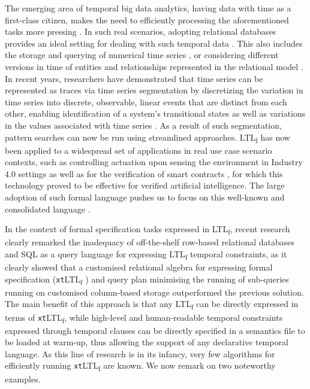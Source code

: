 \documentclass[sigconf]{acmart}
\begin{document}
The emerging area of temporal big data analytics, having data with time as a first-class citizen, makes the need to efficiently processing the aforementioned tasks more pressing \cite{cuzzocrea:LIPIcs.TIME.2021.4,DBLP:reference/db/Amer-YahiaPTKDC18}. In such real scenarios, adopting relational databases provides an ideal setting for dealing with such temporal data \cite{DBLP:conf/caise/SchonigRCJM16}. This also includes the storage and querying of numerical
time series \cite{DBLP:journals/pacmmod/HuangZCS23}, or considering different versions in time of entities and relationships represented in the relational
model \cite{5963680,DBLP:journals/pvldb/KaufmannVFKF13,DBLP:journals/isci/WangJS95,DBLP:conf/cikm/Wang95}. In recent years, researchers have demonstrated that time series can be represented as traces via time series segmentation by discretizing the variation in time series into discrete, observable, linear events that are distinct from each other, enabling identification of a system's transitional states \cite{DBLP:journals/pacmmod/00080ZC23} as well as variations in the values associated with time series \cite{HUO2022117176}. As a result of such segmentation, pattern searches can now be run using streamlined approaches. LTL\textsubscript{f} has now been applied to a widespread set of applications in real use case scenario contexts, such as controlling actuation upon sensing the environment in Industry 4.0 settings  \cite{9591387} as well as for the verification of smart contracts \cite{10.1007/978-3-031-08421-8_9}, for which this technology proved to be effective for verified artificial intelligence. The large adoption of such formal language  pushes us to focus on this well-known and consolidated language \cite{4567924,DBLP:conf/ijcai/GiacomoV13}.

In the context of formal specification tasks expressed in LTL\textsubscript{f}, recent research clearly remarked the inadequacy of off-the-shelf row-based relational databases and SQL as a query language for expressing LTL\textsubscript{f} temporal constraints, as it clearly showed that a customised relational algebra for expressing formal specification (\texttt{xt}LTL\textsubscript{f} \cite{info14030173}) and query plan minimising the running of sub-queries \cite{BellatrecheKB21} running on customised column-based storage outperformed the previous solution. The main benefit of this approach is that any LTL\textsubscript{f} can be directly expressed in terms of \texttt{xt}LTL\textsubscript{f}, while high-level and human-readable temporal constraints expressed through temporal clauses can be directly specified in a semantics file to be loaded at warm-up, thus allowing the support of any declarative temporal language. As this line of research is in its infancy, very few algorithms for efficiently running \texttt{xt}LTL\textsubscript{f} are known. We now remark on two noteworthy examples.
\end{document}
